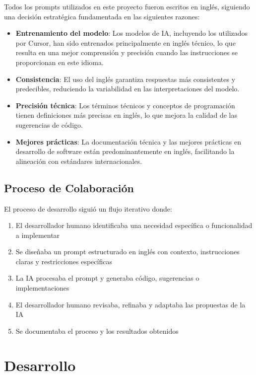 \documentclass[12pt,a4paper]{article}
\begin{document}
Todos los prompts utilizados en este proyecto fueron escritos en inglés, siguiendo una decisión estratégica fundamentada en las siguientes razones:

\begin{itemize}
    \item \textbf{Entrenamiento del modelo}: Los modelos de IA, incluyendo los utilizados por Cursor, han sido entrenados principalmente en inglés técnico, lo que resulta en una mejor comprensión y precisión cuando las instrucciones se proporcionan en este idioma.
    \item \textbf{Consistencia}: El uso del inglés garantiza respuestas más consistentes y predecibles, reduciendo la variabilidad en las interpretaciones del modelo.
    \item \textbf{Precisión técnica}: Los términos técnicos y conceptos de programación tienen definiciones más precisas en inglés, lo que mejora la calidad de las sugerencias de código.
    \item \textbf{Mejores prácticas}: La documentación técnica y las mejores prácticas en desarrollo de software están predominantemente en inglés, facilitando la alineación con estándares internacionales.
\end{itemize}

\subsection{Proceso de Colaboración}

El proceso de desarrollo siguió un flujo iterativo donde:

\begin{enumerate}
    \item El desarrollador humano identificaba una necesidad específica o funcionalidad a implementar
    \item Se diseñaba un prompt estructurado en inglés con contexto, instrucciones claras y restricciones específicas
    \item La IA procesaba el prompt y generaba código, sugerencias o implementaciones
    \item El desarrollador humano revisaba, refinaba y adaptaba las propuestas de la IA
    \item Se documentaba el proceso y los resultados obtenidos
\end{enumerate}

\section{Desarrollo}
\end{document}
